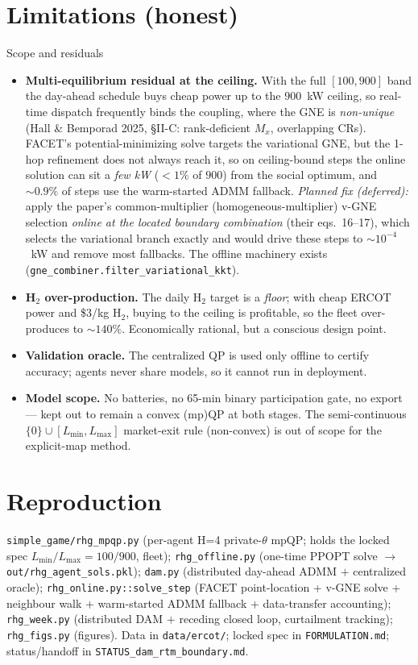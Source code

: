 \documentclass[11pt, letterpaper]{article}
\begin{document}
\section{Limitations (honest)}\label{sec:limit}
\begin{warnbox}{Scope and residuals}
\begin{itemize}[nosep]
\item \textbf{Multi-equilibrium residual at the ceiling.} With the full $[100,900]$ band the
day-ahead schedule buys cheap power up to the $900$~kW ceiling, so real-time dispatch frequently
binds the coupling, where the GNE is \emph{non-unique} (Hall \& Bemporad 2025, \S II-C: rank-deficient
$M_x$, overlapping CRs). FACET's potential-minimizing solve targets the variational GNE, but the
1-hop refinement does not always reach it, so on ceiling-bound steps the online solution can sit a
\emph{few kW} ($<\!1\%$ of $900$) from the social optimum, and $\sim\!0.9\%$ of steps use the
warm-started ADMM fallback. \emph{Planned fix (deferred):} apply the paper's common-multiplier
(homogeneous-multiplier) v-GNE selection \emph{online at the located boundary combination} (their
eqs.~16--17), which selects the variational branch exactly and would drive these steps to
$\sim\!10^{-4}$~kW and remove most fallbacks. The offline machinery exists
(\texttt{gne\_combiner.filter\_variational\_kkt}).
\item \textbf{H$_2$ over-production.} The daily H$_2$ target is a \emph{floor}; with cheap ERCOT power
and \$3/kg H$_2$, buying to the ceiling is profitable, so the fleet over-produces to $\sim\!140\%$.
Economically rational, but a conscious design point.
\item \textbf{Validation oracle.} The centralized QP is used only offline to certify accuracy; agents
never share models, so it cannot run in deployment.
\item \textbf{Model scope.} No batteries, no 65-min binary participation gate, no export --- kept out
to remain a convex (mp)QP at both stages. The semi-continuous $\{0\}\cup[L_{\min},L_{\max}]$
market-exit rule (non-convex) is out of scope for the explicit-map method.
\end{itemize}
\end{warnbox}

\section{Reproduction}
\texttt{simple\_game/rhg\_mpqp.py} (per-agent H=4 private-$\theta$ mpQP; holds the locked spec
$L_{\min}/L_{\max}=100/900$, fleet); \texttt{rhg\_offline.py} (one-time PPOPT solve $\to$
\texttt{out/rhg\_agent\_sols.pkl}); \texttt{dam.py} (distributed day-ahead ADMM $+$ centralized
oracle); \texttt{rhg\_online.py::solve\_step} (FACET point-location + v-GNE solve + neighbour walk +
warm-started ADMM fallback + data-transfer accounting); \texttt{rhg\_week.py} (distributed DAM $+$
receding closed loop, curtailment tracking); \texttt{rhg\_figs.py} (figures). Data in
\texttt{data/ercot/}; locked spec in \texttt{FORMULATION.md}; status/handoff in
\texttt{STATUS\_dam\_rtm\_boundary.md}.
\end{document}
